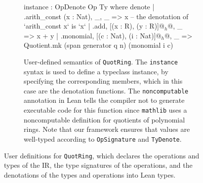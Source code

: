 \begin{figure}[t]
\begin{subfigure}[b]{\textwidth}
\begin{lean}[escapeinside=@@]
instance : OpDenote Op Ty where
  denote
  | .arith_const (x : Nat), _, _ => x -- the denotation of `arith_const x` is  `x`
  | .add, [(x : R), (y : R)]@$_h$@, _ => x + y
  | .monomial, [(c : Nat), (i : Nat)]@$_h$@, _ =>
        Quotient.mk (span {generator q n}) (monomial i c)
\end{lean}
		\caption{\label{fig:mlir:quotring-semantics} User-defined semantics of \texttt{QuotRing}.
			The \texttt{instance} syntax is used to define a typeclass instance, by specifying the corresponding members, which in this case are the denotation functions.
			The \texttt{noncomputable} annotation in Lean tells the compiler not to generate executable code for this function since \texttt{mathlib} uses a noncomputable definition for quotients of polynomial rings.
			Note that our framework ensures that values are well-typed according to \texttt{OpSignature} and \texttt{TyDenote}.}
	\end{subfigure}
	\caption{\label{fig:mlir:quotring-defs}User definitions for \texttt{QuotRing}, which declares the operations and types of the IR, the type signatures of the operations, and the denotations of the types and operations into Lean types.}
\end{figure}

